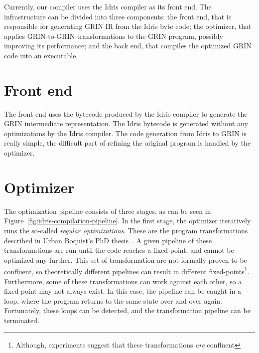 \documentclass[main.tex]{subfiles}
\begin{document}
	
	Currently, our compiler uses the Idris compiler as its front end. The infrastructure can be divided into three components: the front end, that is responsible for generating GRIN IR from the Idris byte code; the optimizer, that applies GRIN-to-GRIN transformations to the GRIN program, possibly improving its performance; and the back end, that compiles the optimized GRIN code into an executable.
	
	\section{Front end}
	\label{subsec:idris-front-end}
	
	The front end uses the bytecode produced by the Idris compiler to generate the GRIN intermediate representation. The Idris bytecode is generated without any optimizations by the Idris compiler. The code generation from Idris to GRIN is really simple, the difficult part of refining the original program is handled by the optimizer. 
	
	\section{Optimizer}
	\label{subsec:optimizer}
	
	The optimization pipeline consists of three stages, as can be seen in Figure~\ref{fig:idris-compilation-pipeline}. In the first stage, the optimizer iteratively runs the so-called \textit{regular optimizations}. These are the program transformations described in Urban Boquist's PhD thesis~\cite{boquist-phd}. A given pipeline of these transformations are run until the code reaches a fixed-point, and cannot be optimized any further. This set of transformation are not formally proven to be confluent, so theoretically different pipelines can result in different fixed-points\footnote{Although, experiments suggest that these transformations \textit{are} confluent}. Furthermore, some of these transformations can work against each other, so a fixed-point may not always exist. In this case, the pipeline can be caught in a loop, where the program returns to the same state over and over again. Fortunately, these loops can be detected, and the transformation pipeline can be terminated. 
	
	\begin{figure}[t] 
		\centering
		
	\end{figure}
	
\end{document}
